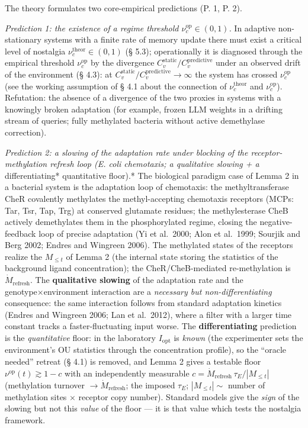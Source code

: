 \documentclass[pdflatex,sn-mathphys-ay]{sn-jnl}
\begin{document}
The theory formulates two core-empirical predictions (P. 1, P. 2).



\emph{Prediction 1: the existence of a regime threshold \(\nu_c^{\text{op}} \in (0, 1)\).} In adaptive non-stationary systems with a finite rate of memory update there must exist a critical level of nostalgia \(\nu_c^{\text{theor}} \in (0, 1)\) (§ 5.3); operationally it is diagnosed through the empirical threshold \(\nu_c^{\text{op}}\) by the divergence \(C_v^{\text{static}}/C_v^{\text{predictive}}\) under an observed drift of the environment (§ 4.3): at \(C_v^{\text{static}}/C_v^{\text{predictive}} \to \infty\) the system has crossed \(\nu_c^{\text{op}}\) (see the working assumption of § 4.1 about the connection of \(\nu_c^{\text{theor}}\) and \(\nu_c^{\text{op}}\)). Refutation: the absence of a divergence of the two proxies in systems with a knowingly broken adaptation (for example, frozen LLM weights in a drifting stream of queries; fully methylated bacteria without active demethylase correction).



\emph{Prediction 2: a slowing of the adaptation rate under blocking of the receptor-methylation refresh loop (E. coli chemotaxis; a qualitative slowing + a }differentiating* quantitative floor).* The biological paradigm case of Lemma 2 in a bacterial system is the adaptation loop of chemotaxis: the methyltransferase CheR covalently methylates the methyl-accepting chemotaxis receptors (MCPs: Tar, Tsr, Tap, Trg) at conserved glutamate residues; the methylesterase CheB actively demethylates them in the phosphorylated regime, closing the negative-feedback loop of precise adaptation (Yi et al.~2000; Alon et al.~1999; Sourjik and Berg 2002; Endres and Wingreen 2006). The methylated states of the receptors realize the \(M_{\le t}\) of Lemma 2 (the internal state storing the statistics of the background ligand concentration); the CheR/CheB-mediated re-methylation is \(\dot M_{\text{refresh}}\). The \textbf{qualitative slowing} of the adaptation rate and the genotype×environment interaction are a \emph{necessary but non-differentiating} consequence: the same interaction follows from standard adaptation kinetics (Endres and Wingreen 2006; Lan et al.~2012), where a filter with a larger time constant tracks a faster-fluctuating input worse. The \textbf{differentiating} prediction is the \emph{quantitative} floor: in the laboratory \(I_{\text{opt}}\) is \emph{known} (the experimenter sets the environment's OU statistics through the concentration profile), so the ``oracle needed'' retreat (§ 4.1) is removed, and Lemma 2 gives a testable floor \(\nu^{\text{op}}(t) \gtrsim 1-c\) with an independently measurable \(c = \dot M_{\text{refresh}}\,\tau_E/|M_{\le t}|\) (methylation turnover \(\to \dot M_{\text{refresh}}\); the imposed \(\tau_E\); \(|M_{\le t}| \sim\) number of methylation sites \(\times\) receptor copy number). Standard models give the \emph{sign} of the slowing but not this \emph{value} of the floor --- it is that value which tests the nostalgia framework.
\end{document}
